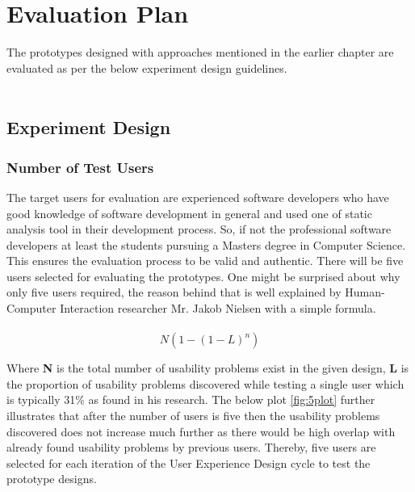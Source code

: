 \chapter{Evaluation Plan}
\label{ch:evaluationplan} 

The prototypes designed with approaches mentioned in the earlier chapter are evaluated as per the below experiment design guidelines. \\ \\

\section{Experiment Design}

\subsection{Number of Test Users}

The target users for evaluation are experienced software developers who have good knowledge of software development in general and used one of static analysis tool in their development process. So, if not the professional software developers at least the students pursuing a Masters degree in Computer Science. This ensures the evaluation process to be valid and authentic. There will be five users selected for evaluating the prototypes. One might be surprised about why only five users required, the reason behind that is well explained by Human-Computer Interaction researcher Mr. Jakob Nielsen with a simple formula\cite{five}. \\ \\

\[ N (1-(1- L )^n ) \]

Where \textbf{N} is the total number of usability problems exist in the given design, \textbf{L} is the proportion of usability problems discovered while testing a single user which is typically 31\% as found in his research. The below plot \ref{fig:5plot} further illustrates that after the number of users is five then the usability problems discovered does not increase much further as there would be high overlap with already found usability problems by previous users. Thereby, five users are selected for each iteration of the User Experience Design cycle to test the prototype designs. \\ \\

